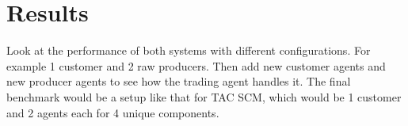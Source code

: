 \section{Results}

Look at the performance of both systems with different configurations.
For example 1 customer and 2 raw producers.
Then add new customer agents and new producer agents to see how the trading agent handles it.
The final benchmark would be a setup like that for TAC SCM, which would be 1 customer and 2 agents each for 4 unique components.
